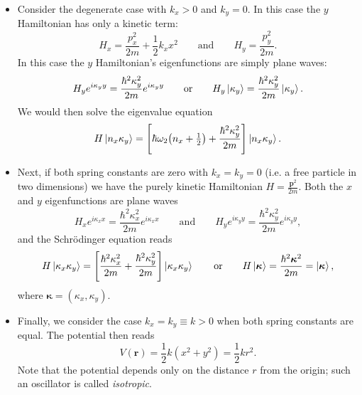 \documentclass[11pt, a4paper]{article}
\newcommand{\eqtext}[1]{\qquad \text{#1} \qquad}
\newcommand{\Schro}{Schr\"{o}dinger\xspace}
\renewcommand{\vec}[1]{\bm{#1}} %
\begin{document}
\begin{itemize}
	\item Consider the degenerate case with $ k_{x} > 0 $ and $ k_{y} = 0 $. In this case the $ y $ Hamiltonian has only a kinetic term:
	\begin{equation*}
		H_{x} = \frac{p_{x}^{2}}{2m} + \frac{1}{2}k_{x}x^{2} \eqtext{and} H_{y} = \frac{p_{y}^{2}}{2m}.
	\end{equation*}
	In this case the $ y $ Hamiltonian's eigenfunctions are simply plane waves:
	\begin{equation*}
		H_{y}e^{i\kappa_{y}y} = \frac{\hbar^{2}\kappa_{y}^{2}}{2m}e^{i\kappa_{y}y} \eqtext{or} H_{y}\ket{\kappa_{y}} = \frac{\hbar^{2}\kappa_{y}^{2}}{2m}\ket{\kappa_{y}}.
	\end{equation*}
	We would then solve the eigenvalue equation
	\begin{equation*}
		H\ket{n_{x}\kappa_{y}} = \left[\hbar \omega_{2}\big(n_{x} + \tfrac{1}{2}\big) + \frac{\hbar^{2}\kappa_{y}^{2}}{2m}\right]\ket{n_{x}\kappa_{y}}.
	\end{equation*}
	
	\item Next, if both spring constants are zero with $ k_{x} = k_{y} = 0 $ (i.e. a free particle in two dimensions) we have the purely kinetic Hamiltonian $ H = \frac{\vec{p}^{2}}{2m} $. Both the $ x $ and $ y $ eigenfunctions are plane waves
	\begin{equation*}
		H_{x}e^{i\kappa_{x}x} = \frac{\hbar^{2}\kappa_{x}^{2}}{2m}e^{i\kappa_{x}x} \eqtext{and} H_{y}e^{i\kappa_{y}y} = \frac{\hbar^{2}\kappa_{y}^{2}}{2m}e^{i\kappa_{y}y},
	\end{equation*}
    and the \Schro equation reads
	\begin{equation*}
		H\ket{\kappa_{x}\kappa_{y}} = \left[\frac{\hbar^{2}\kappa_{x}^{2}}{2m} + \frac{\hbar^{2}\kappa_{y}^{2}}{2m}\right]\ket{\kappa_{x}\kappa_{y}} \eqtext{or} H\ket{\vec{\kappa}} = \frac{\hbar^{2}\vec{\kappa}^{2}}{2m} = \ket{\vec{\kappa}},
	\end{equation*}
	where $ \vec{\kappa} = (\kappa_{x}, \kappa_{y}) $.
	
	\item Finally, we consider the case $ k_{x} = k_{y} \equiv k > 0 $ when both spring constants are equal. The potential then reads
	\begin{equation*}
		V(\vec{r}) = \frac{1}{2}k(x^{2} + y^{2}) = \frac{1}{2}kr^{2}.
	\end{equation*}
	Note that the potential depends only on the distance $ r $ from the origin; such an oscillator is called \textit{isotropic}. 
	

\end{itemize}
\end{document}

